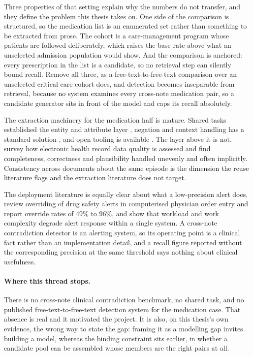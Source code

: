 Three properties of that setting explain why the numbers do not transfer, and they define
the problem this thesis takes on. One side of the comparison is structured, so the medication
list is an enumerated set rather than something to be extracted from prose. The cohort is a
care-management program whose patients are followed deliberately, which raises the base rate
above what an unselected admission population would show. And the comparison is anchored:
every prescription in the list is a candidate, so no retrieval step can silently bound
recall. Remove all three, as a free-text-to-free-text comparison over an unselected critical
care cohort does, and detection becomes inseparable from retrieval, because no system
examines every cross-note medication pair, so a candidate generator sits in front of the
model and caps its recall absolutely.

The extraction machinery for the medication half is mature. Shared tasks established the
entity and attribute layer \citep{uzuner2010medication,henry2020n2c2}, negation and context
handling has a standard solution \citep{chapman2001negex}, and open tooling is available
\citep{neumann2019scispacy,eyre2021medspacy}. The layer above it is not.
\citet{weiskopf2013quality} survey how electronic health record data quality is assessed and
find completeness, correctness and plausibility handled unevenly and often implicitly.
Consistency across documents about the same episode is the dimension the reuse literature
flags and the extraction literature does not target.

The deployment literature is equally clear about what a low-precision alert does.
\citet{vandersijs2006overriding} review overriding of drug safety alerts in computerised
physician order entry and report override rates of 49\% to 96\%, and
\citet{ancker2017alertfatigue} show that workload and work complexity degrade alert response
within a single system. A cross-note contradiction detector is an alerting system, so its
operating point is a clinical fact rather than an implementation detail, and a recall figure
reported without the corresponding precision at the same threshold says nothing about
clinical usefulness.

\paragraph{Where this thread stops.} There is no cross-note clinical contradiction benchmark,
no shared task, and no published free-text-to-free-text detection system for the medication
case. That absence is real and it motivated the project. It is also, on this thesis's own
evidence, the wrong way to state the gap: framing it as a modelling gap invites building a
model, whereas the binding constraint sits earlier, in whether a candidate pool can be
assembled whose members are the right pairs at all.

